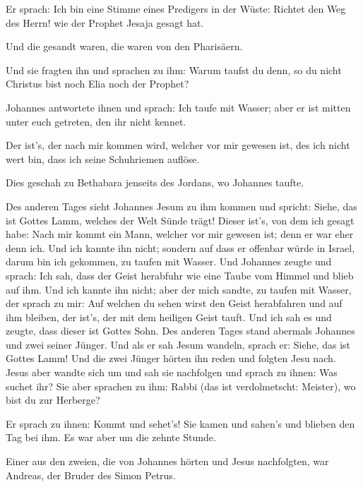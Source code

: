  Er sprach: Ich bin eine Stimme eines Predigers in der
Wüste: Richtet den Weg des Herrn! wie der Prophet Jesaja gesagt hat.

 Und die gesandt waren, die waren von den Pharisäern.

 Und sie fragten ihn und sprachen zu ihm: Warum taufst du
denn, so du nicht Christus bist noch Elia noch der Prophet?

 Johannes antwortete ihnen und sprach: Ich taufe mit
Wasser; aber er ist mitten unter euch getreten, den ihr nicht kennet.

 Der ist's, der nach mir kommen wird, welcher vor mir
gewesen ist, des ich nicht wert bin, dass ich seine Schuhriemen auflöse.

 Dies geschah zu Bethabara jenseits des Jordans, wo
Johannes taufte.

 Des anderen Tages sieht Johannes Jesum zu ihm kommen und
spricht: Siehe, das ist Gottes Lamm, welches der Welt Sünde trägt!
 Dieser ist's, von dem ich gesagt habe: Nach mir kommt
ein Mann, welcher vor mir gewesen ist; denn er war eher denn ich.
 Und ich kannte ihn nicht; sondern auf dass er offenbar
würde in Israel, darum bin ich gekommen, zu taufen mit Wasser.
 Und Johannes zeugte und sprach: Ich sah, dass der Geist
herabfuhr wie eine Taube vom Himmel und blieb auf ihm. 
Und ich kannte ihn nicht; aber der mich sandte, zu taufen mit Wasser,
der sprach zu mir: Auf welchen du sehen wirst den Geist herabfahren und
auf ihm bleiben, der ist's, der mit dem heiligen Geist tauft.
 Und ich sah es und zeugte, dass dieser ist Gottes Sohn.
 Des anderen Tages stand abermals Johannes und zwei
seiner Jünger.  Und als er sah Jesum wandeln, sprach er:
Siehe, das ist Gottes Lamm!  Und die zwei Jünger hörten
ihn reden und folgten Jesu nach.  Jesus aber wandte sich
um und sah sie nachfolgen und sprach zu ihnen: Was suchet ihr? Sie aber
sprachen zu ihm: Rabbi (das ist verdolmetscht: Meister), wo bist du zur
Herberge?

 Er sprach zu ihnen: Kommt und sehet's! Sie kamen und
sahen's und blieben den Tag bei ihm. Es war aber um die zehnte Stunde.

 Einer aus den zweien, die von Johannes hörten und Jesus
nachfolgten, war Andreas, der Bruder des Simon Petrus.

